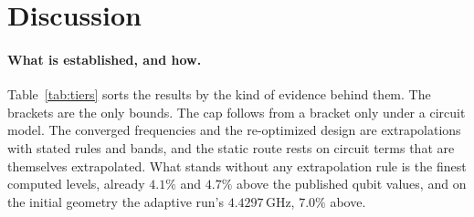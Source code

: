 \documentclass{anvil-paper}
\begin{document}
\section{Discussion}
\label{sec:discussion}

\paragraph{What is established, and how.}
Table~\ref{tab:tiers} sorts the results by the kind of evidence behind
them. The brackets are the only bounds. The cap follows from a bracket
only under a circuit model. The converged frequencies and the re-optimized
design are extrapolations with stated rules and bands, and the static route
rests on circuit terms that are themselves extrapolated. What stands
without any extrapolation rule is the finest computed levels, already
$4.1\%$ and $4.7\%$ above the published qubit values, and on the initial
geometry the adaptive run's $4.4297$\,GHz, $7.0\%$ above.
\end{document}
